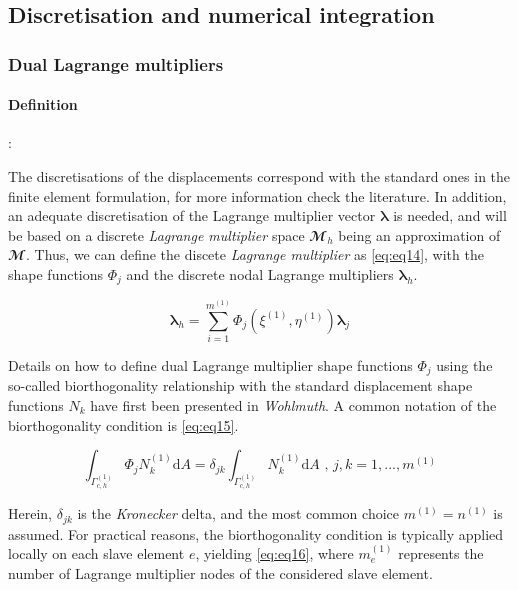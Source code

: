 \documentclass[a4paper,10pt]{article} %
\begin{document}
\subsection{Discretisation and numerical integration}

\subsubsection{Dual Lagrange multipliers}

\paragraph{Definition}:

The discretisations of the displacements correspond with the standard ones in the finite element formulation, for more information check the literature\cite{Zienkiewicz1}. In addition, an adequate discretisation of the Lagrange multiplier vector $\boldsymbol{\lambda}$ is needed, and will be based on a discrete \textit{Lagrange multiplier} space $\mathbfcal{M}_h$ being an approximation of $\mathbfcal{M}$. Thus, we can define the discete \textit{Lagrange multiplier} as \eqref{eq:eq14}, with the shape functions $\Phi_j$ and the discrete nodal Lagrange multipliers $\boldsymbol{\lambda}_h$.

\begin{equation}\label{eq:eq14}
    \boldsymbol{\lambda}_h = \sum_{i=1}^{m^{(1)}} \Phi_j\left(\xi^{(1)},\eta^{(1)} \right) \boldsymbol{\lambda}_j
\end{equation}

Details on how to define dual Lagrange multiplier shape functions $\Phi_j$ using the so-called biorthogonality relationship with the standard displacement shape functions $N_k$ have first been presented in \textit{Wohlmuth}\cite{wohlmuth}. A common notation of the biorthogonality condition is \eqref{eq:eq15}.

\begin{equation}\label{eq:eq15}
    \int_{\Gamma_{c,h}^{(1)}}\Phi_j N_k^{(1)} \text{d}A = \delta_{jk} \int_{\Gamma_{c,h}^{(1)}} N_k^{(1)} \text{d}A \text{ , } j,k=1,...,m^{(1)}
\end{equation}

Herein, $\delta_{jk}$ is the \textit{Kronecker} delta, and the most common choice $m^{(1)} = n^{(1)}$ is assumed. For
practical reasons, the biorthogonality condition is typically applied locally on each slave element $e$, yielding \eqref{eq:eq16}, where $m_e^{(1)}$ represents the number of Lagrange multiplier nodes of the considered slave element.
\end{document}
